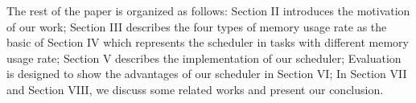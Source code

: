 The rest of the paper is organized as follows: Section II introduces the motivation of our work; Section III describes the four types of memory usage rate as the basic of Section IV which represents the scheduler in tasks with different memory usage rate; Section V describes the implementation of our scheduler; Evaluation is designed to show the advantages of our scheduler in Section VI; In Section VII and Section VIII, we discuss some related works and present our conclusion.